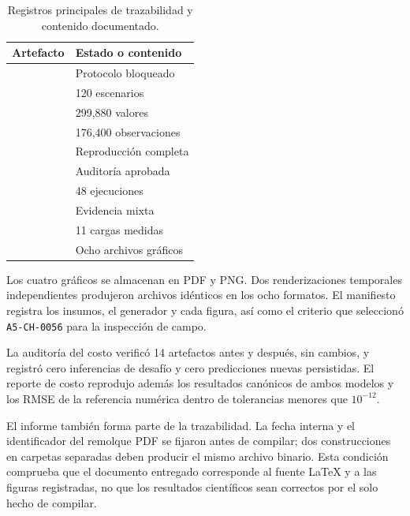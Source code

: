 \documentclass[11pt,a4paper]{article}
\newcommand{\code}[1]{\texttt{#1}}
\begin{document}
\begin{table}[htbp]
\centering
\caption{Registros principales de trazabilidad y contenido documentado.}
\label{tab:traceability}
\small
\begin{tabularx}{\textwidth}{@{}Yl@{}}
\toprule
Artefacto & Estado o contenido \\
\midrule
{} & Protocolo bloqueado \\
 & 120 escenarios \\
 & 299,880 valores \\
 & 176,400 observaciones \\
 & Reproducción completa \\
 & Auditoría aprobada \\
 & 48 ejecuciones \\
 & Evidencia mixta \\
 & 11 cargas medidas \\
 & Ocho archivos gráficos \\
\bottomrule
\end{tabularx}
\end{table}

Los cuatro gráficos se almacenan en PDF y PNG. Dos renderizaciones temporales
independientes produjeron archivos idénticos en los ocho formatos. El
manifiesto registra los insumos, el generador y cada figura, así como el criterio
que seleccionó \code{A5-CH-0056} para la inspección de campo.

La auditoría del costo verificó 14 artefactos antes y después, sin cambios, y
registró cero inferencias de desafío y cero predicciones nuevas persistidas.
El reporte de costo reprodujo además los resultados canónicos de ambos modelos
y los RMSE de la referencia numérica dentro de tolerancias menores que
$10^{-12}$.

El informe también forma parte de la trazabilidad. La fecha interna y el
identificador del remolque PDF se fijaron antes de compilar; dos construcciones
en carpetas separadas deben producir el mismo archivo binario. Esta condición
comprueba que el documento entregado corresponde al fuente LaTeX y a las
figuras registradas, no que los resultados científicos sean correctos por el
solo hecho de compilar.
\end{document}

